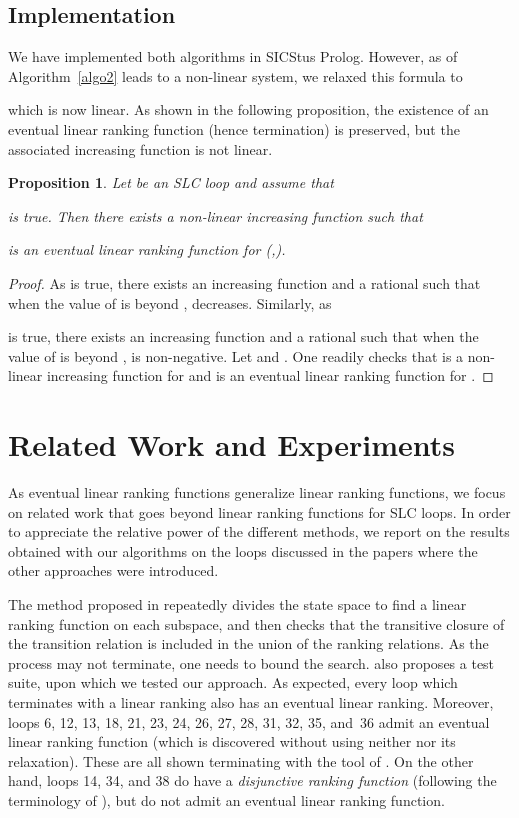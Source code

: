 \documentclass{acm_proc_article-sp}
\newtheorem{proposition}[theorem]{Proposition}
\begin{document}
\subsection{Implementation}
\label{sec:implementation}

We  have implemented both algorithms in SICStus Prolog.
However, as  of Algorithm~\ref{algo2}
leads to a non-linear system, we relaxed this formula to

which is now linear. As shown in the following proposition, the existence
of an eventual linear ranking function (hence termination) is preserved,
but the associated increasing function is not linear.

\begin{proposition}
Let  be an SLC loop and assume that

is true.
Then there exists a non-linear increasing function  such that

is an eventual linear ranking function for (,).
\end{proposition}

\begin{proof}
As 
is true, there exists an increasing function  and a rational
 such that when the value of  is beyond , 
decreases.
Similarly, as

is true, there exists an increasing function  and a rational
 such that when the value of  is beyond ,  is
non-negative.
Let  and
.
One readily checks that  is a non-linear increasing function for 
and  is an eventual linear ranking function for .
\end{proof}


\section{Related Work and Experiments }
\label{sec:related-work-and-experiments}

As eventual linear ranking functions generalize linear ranking
functions, we focus on related work that goes beyond linear ranking
functions for SLC loops.
In order to appreciate the relative power of the different methods,
we report on the results obtained with  our algorithms on the loops
discussed in the papers where the other approaches were introduced.

The method proposed in \cite{ChenFM12} repeatedly divides the state
space to find a linear ranking function on each subspace, and then
checks that the transitive closure of the transition relation is
included in the union of the ranking relations.
As the process may not terminate, one needs to bound the search.
\cite{ChenFM12} also proposes a test suite, upon which we tested
our approach.
As expected, every loop \cite[Table~1]{ChenFM12} which terminates with
a linear ranking also has an eventual linear ranking.
Moreover, loops 6, 12, 13, 18, 21, 23, 24, 26, 27, 28, 31, 32, 35, and~36
admit an eventual linear ranking function (which is discovered without
using neither  nor its relaxation).
These are all shown terminating with the tool of \cite{ChenFM12}.
On the other hand, loops 14, 34, and 38 do have a
\emph{disjunctive ranking function}
(following the terminology of \cite{ChenFM12}),
but do not admit an eventual linear ranking function.
\end{document}
